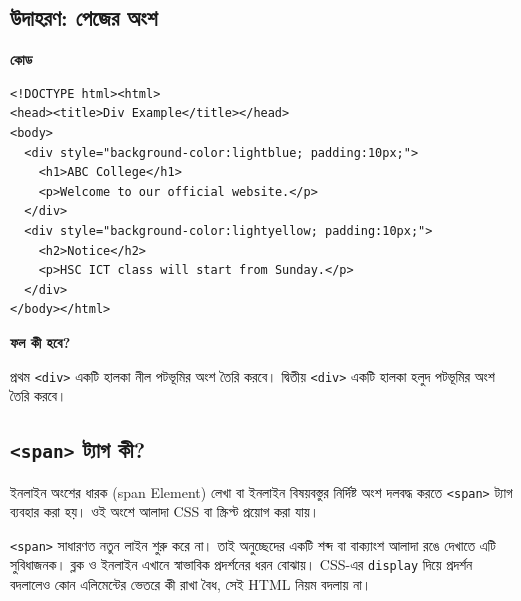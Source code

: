 \subsection{উদাহরণ: পেজের অংশ}

\par\noindent
\begin{minipage}[t]{.60\linewidth}\vspace{0pt}\small
\textbf{\color{chFourTeal}কোড}\par
\par\noindent
\begin{verbatim}
<!DOCTYPE html><html>
<head><title>Div Example</title></head>
<body>
  <div style="background-color:lightblue; padding:10px;">
    <h1>ABC College</h1>
    <p>Welcome to our official website.</p>
  </div>
  <div style="background-color:lightyellow; padding:10px;">
    <h2>Notice</h2>
    <p>HSC ICT class will start from Sunday.</p>
  </div>
</body></html>
\end{verbatim}
\par
\par\smallskip
\end{minipage}\hfill
\begin{minipage}[t]{.36\linewidth}\vspace{0pt}\small
\textbf{\color{chFourTeal}ফল কী হবে?}\par
প্রথম \texttt{<div>} একটি হালকা নীল পটভূমির অংশ তৈরি করবে। দ্বিতীয় \texttt{<div>} একটি হালকা হলুদ পটভূমির অংশ তৈরি করবে।
\par\smallskip
\end{minipage}\par


\subsection{\texttt{<span>} ট্যাগ কী?}

\begin{definitionbox}{ইনলাইন অংশের ধারক (span Element)}
লেখা বা ইনলাইন বিষয়বস্তুর নির্দিষ্ট অংশ দলবদ্ধ করতে \texttt{<span>} ট্যাগ ব্যবহার করা হয়। ওই অংশে আলাদা CSS বা স্ক্রিপ্ট প্রয়োগ করা যায়।
\end{definitionbox}

\texttt{<span>} সাধারণত নতুন লাইন শুরু করে না। তাই অনুচ্ছেদের একটি শব্দ বা বাক্যাংশ আলাদা রঙে দেখাতে এটি সুবিধাজনক। ব্লক ও ইনলাইন এখানে স্বাভাবিক প্রদর্শনের ধরন বোঝায়। CSS-এর \texttt{display} দিয়ে প্রদর্শন বদলালেও কোন এলিমেন্টের ভেতরে কী রাখা বৈধ, সেই HTML নিয়ম বদলায় না।

